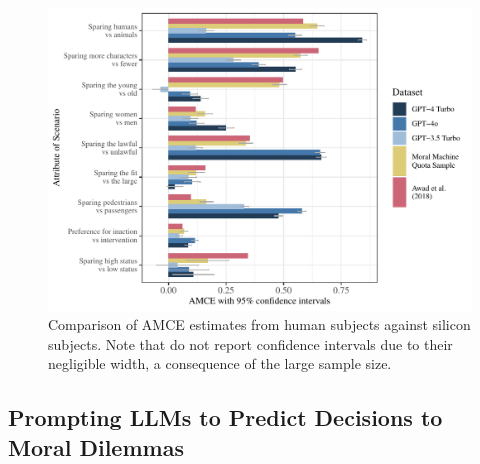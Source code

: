 \begin{figure}[H]
    \centering
    \includegraphics[width=1\linewidth]{8_AMCEs.pdf}
    \caption{Comparison of AMCE estimates from human subjects against silicon subjects. Note that \citet{awad_moral_2018} do not report confidence intervals due to their negligible width, a consequence of the large sample size.}
    \label{fig:amce-estimates}
    \vspace{0.5cm}
\end{figure}


\newpage
\subsection{Prompting LLMs to Predict Decisions to Moral Dilemmas}\label{sec:prompt-llms}

